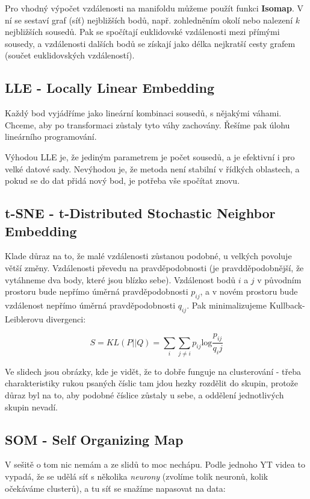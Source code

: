 \documentclass[10pt,a4paper]{article}
\begin{document}
Pro vhodný výpočet vzdálenosti na manifoldu můžeme použít funkci \textbf{Isomap}. V ní se sestaví graf (síť) nejbližších bodů, např. zohledněním okolí nebo nalezení $k$ nejbližších sousedů. Pak se spočítají euklidovské vzdálenosti mezi přímými sousedy, a vzdálenosti dalších bodů se získají jako délka nejkratší cesty grafem (součet euklidovských vzdáleností). 


\subsection{LLE - Locally Linear Embedding}

Každý bod vyjádříme jako lineární kombinaci sousedů, s nějakými váhami. Chceme, aby po transformaci zůstaly tyto váhy zachovány. Řešíme pak úlohu lineárního programování.

Výhodou LLE je, že jediným parametrem je počet sousedů, a je efektivní i pro velké datové sady. Nevýhodou je, že metoda není stabilní v řídkých oblastech, a pokud se do dat přidá nový bod, je potřeba vše spočítat znovu.

\subsection{t-SNE - t-Distributed Stochastic Neighbor Embedding}

Klade důraz na to, že malé vzdálenosti zůstanou podobné, u velkých povoluje větší změny. Vzdálenosti převedu na pravděpodobnosti (je pravdděpodobnější, že vytáhneme dva body, které jsou blízko sebe). Vzdálenost bodů $i$ a $j$ v původním prostoru bude nepřímo úměrná pravděpodobnosti $p_{ij}$, a v novém prostoru bude vzdálenost nepřímo úměrná pravděpodobnosti $q_{ij}$. Pak minimalizujeme Kullback-Leiblerovu divergenci:

\begin{equation}
S=KL(P||Q)=\sum_i\sum_{j\neq i} p_{ij}\text{log}\frac{p_{ij}}{q_ij}
\end{equation}

Ve slidech jsou obrázky, kde je vidět, že to dobře funguje na clusterování - třeba charakteristiky rukou psaných číslic tam jdou hezky rozdělit do skupin, protože důraz byl na to, aby podobné číslice zůstaly u sebe, a oddělení jednotlivých skupin nevadí.

\subsection{SOM - Self Organizing Map}
V sešitě o tom nic nemám a ze slidů to moc nechápu. Podle jednoho YT videa to vypadá, že se udělá síť s několika \textit{neurony} (zvolíme tolik neuronů, kolik očekáváme clusterů), a tu síť se snažíme napasovat na data:
\end{document}
